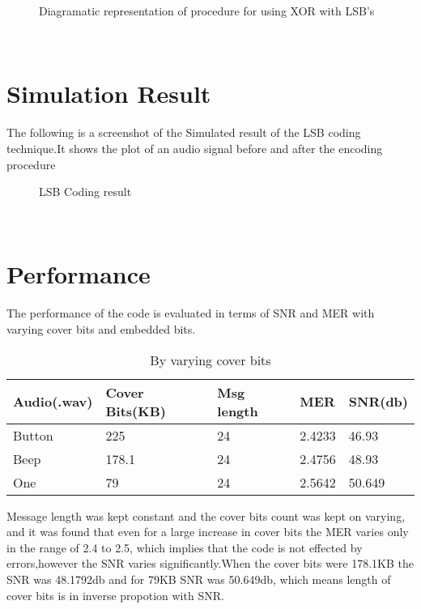 \documentclass[a4paper, 12pt, notitlepage]{report}
\begin{document}
\begin{figure}[h!]
{\par}
\caption{Diagramatic representation of procedure for using XOR with LSB's}
\end{figure}\\

\section{Simulation Result}

The following is a screenshot of the Simulated result of the LSB coding technique.It shows the plot of an audio signal before and after the encoding procedure 

\begin{figure}[h!]
{\par}
\caption{LSB Coding result}
\end{figure}\\
\newpage
\section{Performance}

The performance of the code is evaluated in terms of SNR and MER with varying cover bits and embedded bits.\\


\begin{table}[h]
\begin{tabular}{|l|l|l|l|l|}
\hline
\textbf{ Audio(.wav)}&\textbf{Cover Bits(KB)}&\textbf{Msg length}&\textbf{MER}&\textbf{SNR(db)} \\ \hline
 Button&225  &24  &2.4233  &46.93  \\ \hline
 Beep&178.1  &24  &2.4756  &48.93  \\ \hline
 One&79  &24  &2.5642  &50.649  \\ \hline
\end{tabular}
\caption{By varying cover bits}
\end{table}

Message length was kept constant and the cover bits count was kept on varying, and it was found that even for a large increase in cover bits the MER varies only in the range of 2.4 to 2.5, which implies that the code is not effected by errors,however the SNR varies significantly.When the cover bits were 178.1KB the SNR was 48.1792db and for 79KB SNR was 50.649db, which means length of cover bits is in inverse propotion with SNR.
\end{document}
